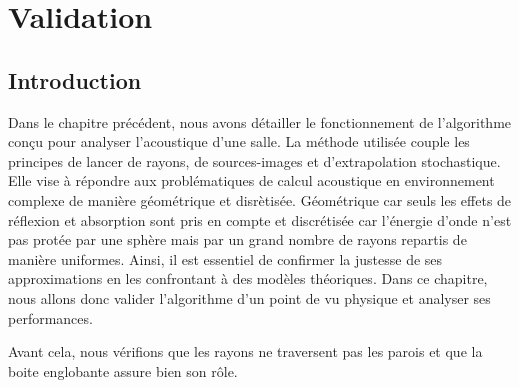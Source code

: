\chapter{Validation}
	\minitoc
	\newpage
	
\section{Introduction}

Dans le chapitre précédent, nous avons détailler le fonctionnement de l'algorithme conçu pour analyser l'acoustique d'une salle. La méthode utilisée couple les principes de lancer de rayons, de sources-images et d'extrapolation stochastique. Elle vise à répondre aux problématiques de calcul acoustique en environnement complexe de manière géométrique et disrètisée. Géométrique car seuls les effets de réflexion et absorption sont pris en compte et discrétisée car l'énergie d'onde n'est pas protée par une sphère mais par un grand nombre de rayons repartis de manière uniformes. Ainsi, il est essentiel de confirmer la justesse de ses approximations en les confrontant à des modèles théoriques. Dans ce chapitre, nous allons donc valider l'algorithme d'un point de vu physique et analyser ses performances.

Avant cela, nous vérifions que les rayons ne traversent pas les parois et que la boite englobante assure bien son rôle.

